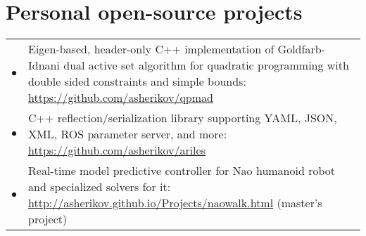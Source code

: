 \documentclass[a4paper,10pt]{report}
\begin{document}
\section{Personal open-source projects}
\begin{adjustwidth}{0.5cm}{0pt}
    \begin{tabularx}{\linewidth}{l X}
        \hfill $\bullet$    &   Eigen-based, header-only C++ implementation of Goldfarb-Idnani dual active set
                                algorithm for quadratic programming with double sided constraints and simple bounds:
                                \href{https://github.com/asherikov/qpmad}{https://github.com/asherikov/qpmad}\\

        \hfill $\bullet$    &   C++ reflection/serialization library supporting
                                YAML, JSON, XML, ROS parameter server, and more:
                                \href{https://github.com/asherikov/ariles}{https://github.com/asherikov/ariles}\\

        \hfill $\bullet$    &   Real-time model predictive controller for Nao
                                humanoid robot and specialized solvers for it:
                                \href{http://asherikov.github.io/Projects/naowalk.html}
                                {http://asherikov.github.io/Projects/naowalk.html} (master's project)
    \end{tabularx}
\end{adjustwidth}


\vspace{0.2cm}
\end{document}
